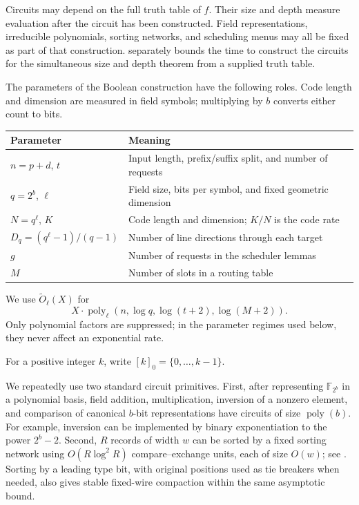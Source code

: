 \documentclass[11pt]{article}
\newcommand{\F}{\mathbb{F}}
\newcommand{\poly}{\operatorname{poly}}
\begin{document}
Circuits may depend on the full truth table of $f$.  Their size and depth
measure evaluation after the circuit has been constructed.  Field
representations, irreducible polynomials, sorting networks, and scheduling
menus may all be fixed as part of that construction.
 separately bounds the time to construct
the circuits for the simultaneous size and depth theorem from a supplied
truth table.

The parameters of the Boolean construction have the following roles.
Code length and dimension are measured in field symbols; multiplying by
$b$ converts either count to bits.
\begin{center}
\small
\begin{tabularx}{\linewidth}{@{}lX@{}}
\toprule
Parameter & Meaning \\
\midrule
$n=p+d$, $t$ & Input length, prefix/suffix split, and number of requests \\
$q=2^b$, $\ell$ & Field size, bits per symbol, and fixed geometric dimension \\
$N=q^\ell$, $K$ & Code length and dimension; $K/N$ is the code rate \\
$D_q=(q^\ell-1)/(q-1)$ & Number of line directions through each target \\
$g$ & Number of requests in the scheduler lemmas \\
$M$ & Number of slots in a routing table \\
\bottomrule
\end{tabularx}
\end{center}

We use $\widetilde O_\ell(X)$ for
\[
  X\cdot\poly_\ell(n,\log q,\log(t+2),\log(M+2)).
\]
Only polynomial factors are suppressed; in the parameter regimes used below,
they never affect an exponential rate.

For a positive integer $k$, write $[k]_0=\{0,\ldots,k-1\}$.

We repeatedly use two standard circuit primitives.  First, after representing
$\F_{2^b}$ in a polynomial basis, field addition, multiplication, inversion of
a nonzero element, and comparison of canonical $b$-bit representations have
circuits of size $\poly(b)$.  For example, inversion can be implemented by
binary exponentiation to the power $2^b-2$.  Second, $R$ records of width $w$
can be sorted by a fixed sorting network using $O(R\log^2 R)$ compare--exchange
units, each of size $O(w)$; see \cite{Batcher1968}.  Sorting by a leading type
bit, with original positions used as tie breakers when needed, also gives
stable fixed-wire compaction within the same asymptotic bound.
\end{document}
